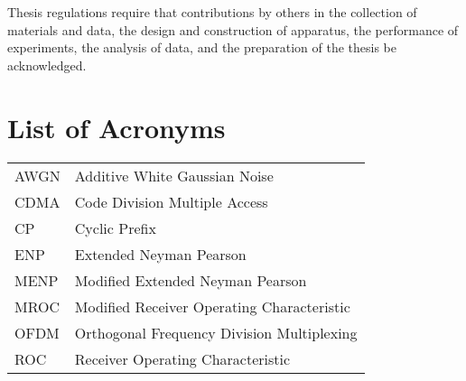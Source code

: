 \documentclass [12pt,letterpaper]{report}
\begin{document}
Thesis regulations require that contributions by others in the collection of
 materials and data, the design and construction of apparatus, the performance
 of experiments, the analysis of data, and the preparation of the thesis be
 acknowledged.

\tableofcontents
\listoffigures
\listoftables

\newpage
\chapter*{List of Acronyms}

\begin{longtable}{ll}
  AWGN    &   Additive White Gaussian Noise\\
  CDMA    &   Code Division Multiple Access\\
  CP      &   Cyclic Prefix\\
  ENP     &   Extended Neyman Pearson\\
  MENP    &   Modified Extended Neyman Pearson\\
  MROC    &   Modified Receiver Operating Characteristic\\
  OFDM    &   Orthogonal Frequency Division Multiplexing\\
  ROC     &   Receiver Operating Characteristic
\end{longtable}

\cleardoublepage
{}

\typeout{}


\typeout{}


\typeout{}


\typeout{}


\typeout{}


\appendix

\typeout{}


\typeout{}
\begin{singlespace}
  
  
\end{singlespace}
\end{document}
